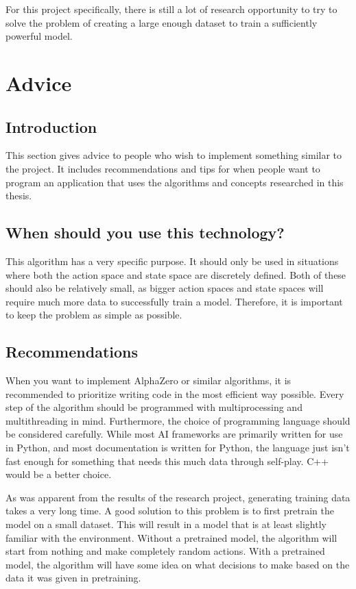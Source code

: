 \documentclass{article}
\begin{document}
For this project specifically, there is still a lot of research opportunity to try to solve the problem
of creating a large enough dataset to train a sufficiently powerful model.





\newpage
\section{Advice}

\subsection{Introduction}

This section gives advice to people who wish to implement something similar to the project.
It includes recommendations and tips for when people want to program an application that uses
the algorithms and concepts researched in this thesis.

\subsection{When should you use this technology?}

This algorithm has a very specific purpose. It should only be used in situations where
both the action space and state space are discretely defined. Both of these should also
be relatively small, as bigger action spaces and state spaces will require much more 
data to successfully train a model. 
Therefore, it is important to keep the problem as simple as possible. 

\subsection{Recommendations}

When you want to implement AlphaZero or similar algorithms, it is recommended to
prioritize writing code in the most efficient way possible. Every step of the algorithm
should be programmed with multiprocessing and multithreading in mind. Furthermore,
the choice of programming language should be considered carefully. While most AI 
frameworks are primarily written for use in Python, and most documentation is written
for Python, the language just isn't fast enough for something that needs this much data through self-play. 
C++ would be a better choice.

As was apparent from the results of the research project, generating training data 
takes a very long time. A good solution to this problem is to first pretrain the model
on a small dataset. This will result in a model that is at least slightly familiar 
with the environment. Without a pretrained model, the algorithm will start from nothing
and make completely random actions. With a pretrained model, the algorithm will have some 
idea on what decisions to make based on the data it was given in pretraining.
\end{document}
